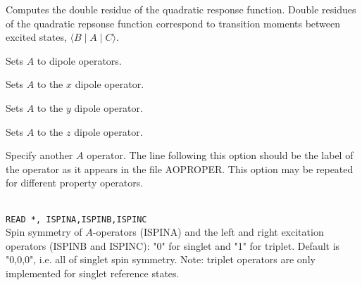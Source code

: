 \begin{description}

\item{}
Computes the double residue
of the quadratic
response function.
Double residues of the quadratic repsonse function correspond to transition
moments between excited states,
$\langle B \mid A \mid C \rangle$. 

\item{}
Sets $A$ to dipole operators.

\item{}
Sets $A$ to the $x$ dipole operator.

\item{}
Sets $A$ to the $y$ dipole operator.

\item{}
Sets $A$ to the $z$ dipole operator.

\item[\Key{PROPRT}]
Specify another $A$ operator. The line following this
option should be the label of the operator as it appears in the file
AOPROPER. This option may be repeated for different property operators.

\item{}\\
\verb|READ *, ISPINA,ISPINB,ISPINC|\\
Spin symmetry of $A$-operators (ISPINA)
and the left and right excitation operators (ISPINB and ISPINC):
"0" for singlet and "1" for triplet.
Default is "0,0,0", i.e. all of singlet spin symmetry.
Note: triplet operators are only implemented for singlet reference states.



\end{description}
